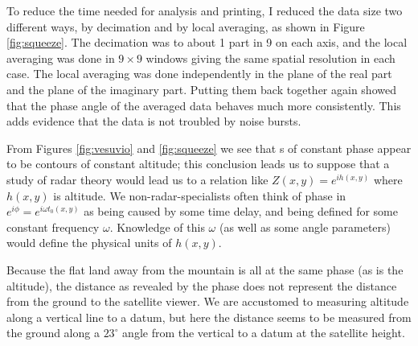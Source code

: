 \par
To reduce the time needed for analysis and printing,
I reduced the data size two different ways,
by decimation and by local averaging,
as shown in Figure \ref{fig:squeeze}.
The decimation was to about 1 part in 9 on each axis,
and the local averaging was done in $9\times 9$ windows
giving the same spatial resolution in each case.
The local averaging was done independently in the
plane of the real part and the plane of the imaginary part.
Putting them back together again showed that the phase
angle of the averaged data behaves much more consistently.
This adds evidence that the data is not troubled by noise bursts.

\par
From Figures \ref{fig:vesuvio} and \ref{fig:squeeze}
we see that s of constant phase
appear to be contours of constant altitude;
this conclusion leads us to suppose that a study of radar theory
would lead us to a relation like $Z(x,y)=e^{ih(x,y)}$
where $h(x,y)$ is altitude.
We non-radar-specialists often think of phase in
$e^{i\phi} = e^{i\omega t_0(x,y)}$
as being caused by some time delay, and
being defined for some constant frequency $\omega$.
Knowledge of this $\omega$ (as well as some angle parameters)
would define the physical units of $h(x,y)$.

Because the flat land away from the mountain is all at the same phase
(as is the altitude),
the distance as revealed by the phase does not represent
the distance from the ground to the satellite viewer.
We are accustomed to measuring altitude along a vertical line to a datum,
but here the distance seems to be measured
from the ground along a $23^\circ$ angle from the vertical
to a datum at the satellite height.


